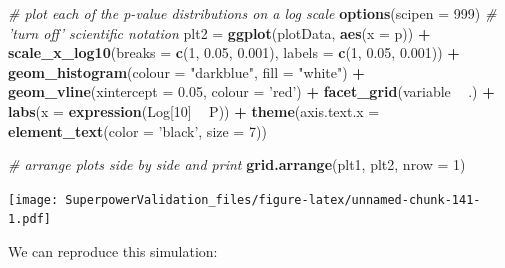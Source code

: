 \documentclass[]{book}
\newenvironment{Shaded}{\begin{snugshade}}{\end{snugshade}}
\newcommand{\CommentTok}[1]{\textcolor[rgb]{0.56,0.35,0.01}{\textit{#1}}}
\newcommand{\DataTypeTok}[1]{\textcolor[rgb]{0.13,0.29,0.53}{#1}}
\newcommand{\DecValTok}[1]{\textcolor[rgb]{0.00,0.00,0.81}{#1}}
\newcommand{\FloatTok}[1]{\textcolor[rgb]{0.00,0.00,0.81}{#1}}
\newcommand{\KeywordTok}[1]{\textcolor[rgb]{0.13,0.29,0.53}{\textbf{#1}}}
\newcommand{\NormalTok}[1]{#1}
\newcommand{\OperatorTok}[1]{\textcolor[rgb]{0.81,0.36,0.00}{\textbf{#1}}}
\newcommand{\StringTok}[1]{\textcolor[rgb]{0.31,0.60,0.02}{#1}}
\begin{document}
\begin{Shaded}
\begin{Highlighting}[]
\CommentTok{# plot each of the p-value distributions on a log scale}
\KeywordTok{options}\NormalTok{(}\DataTypeTok{scipen =} \DecValTok{999}\NormalTok{) }\CommentTok{# 'turn off' scientific notation}
\NormalTok{plt2 =}\StringTok{ }\KeywordTok{ggplot}\NormalTok{(plotData, }\KeywordTok{aes}\NormalTok{(}\DataTypeTok{x =}\NormalTok{ p)) }\OperatorTok{+}
\KeywordTok{scale_x_log10}\NormalTok{(}\DataTypeTok{breaks =} \KeywordTok{c}\NormalTok{(}\DecValTok{1}\NormalTok{, }\FloatTok{0.05}\NormalTok{, }\FloatTok{0.001}\NormalTok{),}
\DataTypeTok{labels =} \KeywordTok{c}\NormalTok{(}\DecValTok{1}\NormalTok{, }\FloatTok{0.05}\NormalTok{, }\FloatTok{0.001}\NormalTok{)) }\OperatorTok{+}
\KeywordTok{geom_histogram}\NormalTok{(}\DataTypeTok{colour =} \StringTok{"darkblue"}\NormalTok{, }\DataTypeTok{fill =} \StringTok{"white"}\NormalTok{) }\OperatorTok{+}
\KeywordTok{geom_vline}\NormalTok{(}\DataTypeTok{xintercept =} \FloatTok{0.05}\NormalTok{, }\DataTypeTok{colour =} \StringTok{'red'}\NormalTok{) }\OperatorTok{+}
\KeywordTok{facet_grid}\NormalTok{(variable }\OperatorTok{~}\StringTok{ }\NormalTok{.) }\OperatorTok{+}
\KeywordTok{labs}\NormalTok{(}\DataTypeTok{x =} \KeywordTok{expression}\NormalTok{(Log[}\DecValTok{10}\NormalTok{] }\OperatorTok{~}\StringTok{ }\NormalTok{P)) }\OperatorTok{+}
\KeywordTok{theme}\NormalTok{(}\DataTypeTok{axis.text.x =} \KeywordTok{element_text}\NormalTok{(}\DataTypeTok{color =} \StringTok{'black'}\NormalTok{, }\DataTypeTok{size =} \DecValTok{7}\NormalTok{))}

\CommentTok{# arrange plots side by side and print}
\KeywordTok{grid.arrange}\NormalTok{(plt1, plt2, }\DataTypeTok{nrow =} \DecValTok{1}\NormalTok{)}
\end{Highlighting}
\end{Shaded}

\texttt{[image: SuperpowerValidation\_files/figure-latex/unnamed-chunk-141-1.pdf]}

We can reproduce this simulation:
\end{document}
